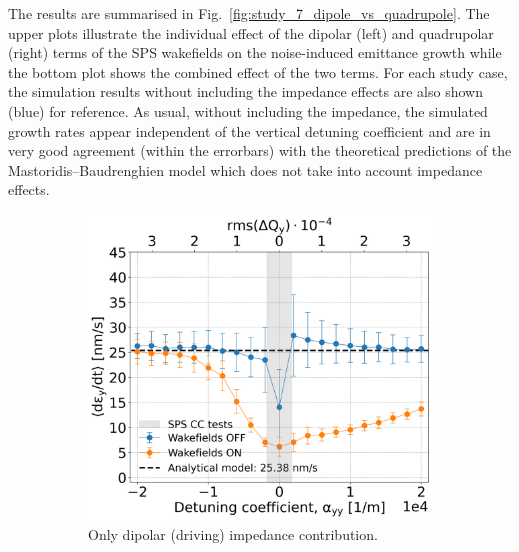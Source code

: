 The results are summarised in Fig.~\ref{fig:study_7_dipole_vs_quadrupole}. The upper plots illustrate the individual effect of the dipolar (left) and quadrupolar (right) terms of the SPS wakefields on the noise-induced emittance growth while the bottom plot shows the combined effect of the two terms. For each study case, the simulation results without including the impedance effects are also shown (blue) for reference. As usual, without including the impedance, the simulated growth rates appear independent of the vertical detuning coefficient and are in very good agreement (within the errorbars) with the theoretical predictions of the Mastoridis--Baudrenghien model which does not take into account impedance effects.

\begin{figure}[htp]
    \centering
    \begin{subfigure}{.45\textwidth}
        \centering
        \includegraphics[width=.95\linewidth]{images/Ch7/dipolar_impedance.png}  
        \caption{Only dipolar (driving) impedance contribution.}
        \label{fig:study_7_dipole}
    \end{subfigure}
    \begin{subfigure}{.45\textwidth}
        \centering

\end{subfigure}
\end{figure}
